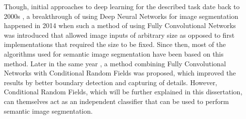 Though, initial approaches to deep learning for the described task date back to 2000s \cite{deep_learning_Ciresan}, a breakthrough of using Deep Neural Networks for image segmentation happened in 2014 \cite{cnn_shelhamer} when such a method of using Fully Convolutional Networks was introduced that allowed image inputs of arbitrary size as opposed to first implementations that required the size to be fixed. Since then, most of the algorithms used for semantic image segmentation have been based on this method. Later in the same year \cite{cnn_liang}, a method combining Fully Convolutional Networks with Conditional Random Fields was proposed, which improved the results by better boundary detection and capturing of details. However, Conditional Random Fields, which will be further explained in this dissertation, can themselves act as an independent classifier that can be used to perform semantic image segmentation. 
